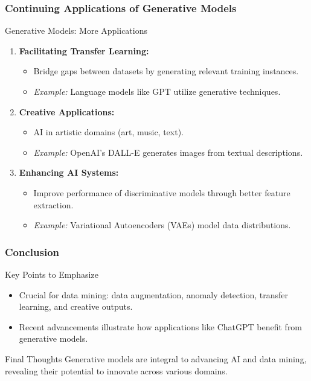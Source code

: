 \documentclass[aspectratio=169]{beamer}
\begin{document}
\begin{frame}[fragile]
    \frametitle{Continuing Applications of Generative Models}
    \begin{block}{Generative Models: More Applications}
        \begin{enumerate}[resume]
            \item \textbf{Facilitating Transfer Learning:}
                \begin{itemize}
                    \item Bridge gaps between datasets by generating relevant training instances.
                    \item \textit{Example:} Language models like GPT utilize generative techniques.
                \end{itemize}
            \item \textbf{Creative Applications:}
                \begin{itemize}
                    \item AI in artistic domains (art, music, text).
                    \item \textit{Example:} OpenAI's DALL-E generates images from textual descriptions.
                \end{itemize}
            \item \textbf{Enhancing AI Systems:}
                \begin{itemize}
                    \item Improve performance of discriminative models through better feature extraction.
                    \item \textit{Example:} Variational Autoencoders (VAEs) model data distributions.
                \end{itemize}
        \end{enumerate}
    \end{block}
\end{frame}

\begin{frame}[fragile]
    \frametitle{Conclusion}
    \begin{block}{Key Points to Emphasize}
        \begin{itemize}
            \item Crucial for data mining: data augmentation, anomaly detection, transfer learning, and creative outputs.
            \item Recent advancements illustrate how applications like ChatGPT benefit from generative models.
        \end{itemize}
    \end{block}
    \begin{block}{Final Thoughts}
        Generative models are integral to advancing AI and data mining, revealing their potential to innovate across various domains.
    \end{block}
\end{frame}
\end{document}
